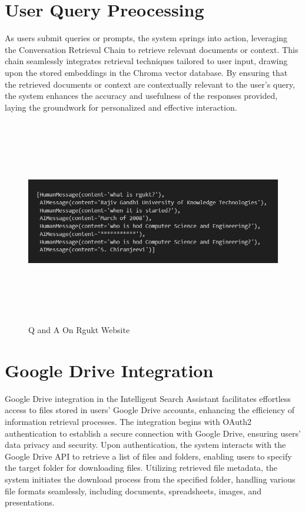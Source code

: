 \documentclass[12pt,a4paper,oneside]{report}
\begin{document}
\section{User Query Preocessing}
\par As users submit queries or prompts, the system springs into action, leveraging the Conversation Retrieval Chain to retrieve relevant documents or context. This chain seamlessly integrates retrieval techniques tailored to user input, drawing upon the stored embeddings in the Chroma vector database. By ensuring that the retrieved documents or context are contextually relevant to the user's query, the system enhances the accuracy and usefulness of the responses provided, laying the groundwork for personalized and effective interaction.
\begin{figure}[ht]
    \centering
    \includegraphics[width=125mm , height = 90mm]{images/rgukt-01.png}
    \caption{Q and A On Rgukt Website}
    \label{fig:figure2_2}
\end{figure}







\newpage
\section{Google Drive Integration}
\par Google Drive integration in the Intelligent Search Assistant facilitates effortless access to files stored in users' Google Drive accounts, enhancing the efficiency of information retrieval processes. The integration begins with OAuth2 authentication to establish a secure connection with Google Drive, ensuring users' data privacy and security. Upon authentication, the system interacts with the Google Drive API to retrieve a list of files and folders, enabling users to specify the target folder for downloading files. Utilizing retrieved file metadata, the system initiates the download process from the specified folder, handling various file formats seamlessly, including documents, spreadsheets, images, and presentations.
\end{document}
